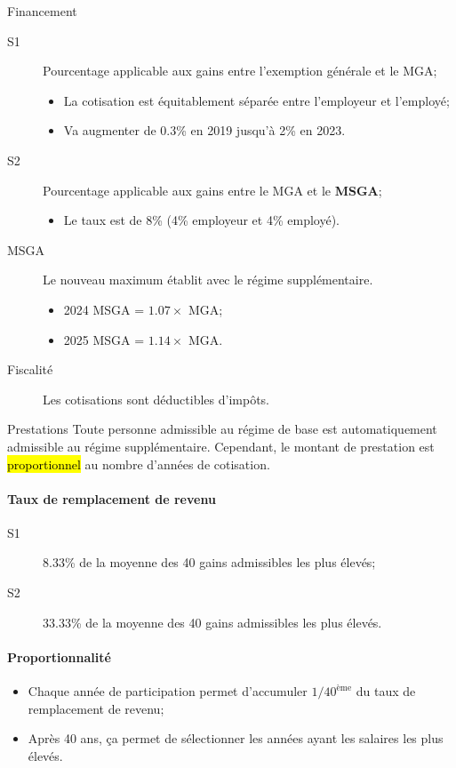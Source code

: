 \documentclass[10pt, french]{article}
\begin{document}
\begin{multicols*}{3}
\begin{conceptgen}{Financement}
\begin{description}
	\item[S1]	Pourcentage applicable aux gains entre l'exemption générale et le MGA;
		\begin{itemize}[leftmargin = *]
		\item	La cotisation est équitablement séparée entre l'employeur et l'employé;
		\item	Va augmenter de 0.3\% en 2019 jusqu'à 2\% en 2023.
		\end{itemize}
	\item[S2]	Pourcentage applicable aux gains entre le MGA et le \textbf{MSGA};
		\begin{itemize}[leftmargin = *]
		\item	Le taux est de 8\% (4\% employeur et 4\% employé).
		\end{itemize}
	\item[MSGA]	Le nouveau maximum établit avec le régime supplémentaire.
		\begin{itemize}[leftmargin = *]
		\item	2024 MSGA = $1.07 \times$ MGA;
		\item	2025 MSGA = $1.14 \times$ MGA.
		\end{itemize}
	\item[Fiscalité]		Les cotisations sont déductibles d'impôts.
\end{description}
\end{conceptgen}

\begin{conceptgen}{Prestations}
Toute personne admissible au régime de base est automatiquement admissible au régime supplémentaire. Cependant, le montant de prestation est \hl{proportionnel} au nombre d'années de cotisation.\\

\paragraph*{Taux de remplacement de revenu}
\begin{description}
	\item[S1]	8.33\% de la moyenne des 40 gains admissibles les plus élevés;
	\item[S2]	33.33\% de la moyenne des 40 gains admissibles les plus élevés.
\end{description}


\paragraph*{Proportionnalité}
\begin{itemize}[leftmargin = *]
	\item	Chaque année de participation permet d'accumuler $1/40^{\text{ème}}$ du taux de remplacement de revenu;
	\item	Après 40 ans, ça permet de sélectionner les années ayant les salaires les plus élevés.
\end{itemize}


\end{conceptgen}
\end{multicols*}
\end{document}
